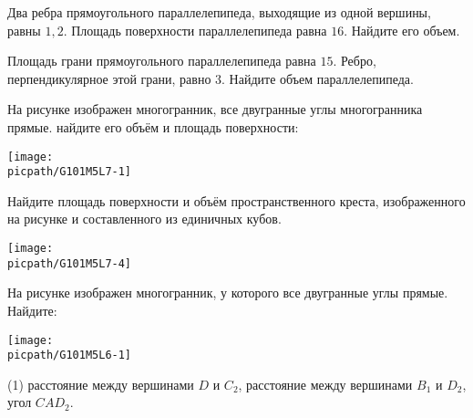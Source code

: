 \begin{class}[number=7]
	\begin{listofex}
		\item Два ребра прямоугольного параллелепипеда, выходящие из одной вершины, равны \(1, 2\). Площадь поверхности параллелепипеда равна \(16\). Найдите его объем.
		\item Площадь грани прямоугольного параллелепипеда равна \( 15 \). Ребро, перпендикулярное этой грани, равно \(3\). Найдите объем параллелепипеда.
		\item 
		\begin{minipage}[t]{\bodywidth}
			На рисунке изображен многогранник, все двугранные углы многогранника прямые. найдите его объём и площадь поверхности:
		\end{minipage}
		\hspace{0.02\linewidth}
		\begin{minipage}[t]{\picwidth}
			\texttt{[image: \\picpath/G101M5L7-1]}
		\end{minipage}
		\item 
		\begin{minipage}[t]{\bodywidth}
			Найдите площадь поверхности и объём пространственного креста, изображенного на рисунке и составленного из единичных кубов.
		\end{minipage}
		\hspace{0.02\linewidth}
		\begin{minipage}[t]{\picwidth}
			\texttt{[image: \\picpath/G101M5L7-4]}
		\end{minipage}
		\item 
		\begin{minipage}[t]{\bodywidth}
			На рисунке изображен многогранник, у которого все двугранные углы прямые. Найдите:
		\end{minipage}
		\hspace{0.02\linewidth}
		\begin{minipage}[t]{\picwidth}
			\texttt{[image: \\picpath/G101M5L6-1]}
		\end{minipage}
		\begin{tasks}(1)
			\task расстояние между вершинами \(D\) и \(C_2\),
			\task расстояние между вершинами \(B_1\) и \(D_2\),
			\task угол \( CAD_2 \).
		\end{tasks}


\end{listofex}
\end{class}
